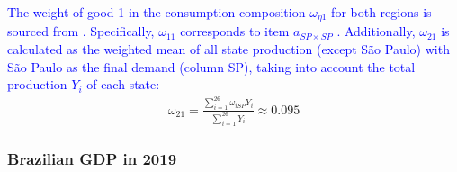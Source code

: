 \documentclass[../thesis.tex]{subfiles}
\begin{document}
\textcolor{blue}{The weight of good 1 in the consumption composition $\omega_{\eta 1}$ for both regions is sourced from \textcite[Table 3, p.442]{haddad_matriz_2017}. Specifically, $\omega_{11}$ corresponds to item $a_{SP\times SP}$ \label{eq:omega-e1}. Additionally, $\omega_{21}$ is calculated as the weighted mean of all state production (except São Paulo) with São Paulo as the final demand (column SP), taking into account the total production $Y_{i}$ of each state:}
\begin{align}
	\omega_{21} = \frac{\sum_{i=1}^{26} \omega_{iSP} Y_i}{\sum_{i=1}^{26} Y_i} \approx 0.095 \label{eq:omega-e2}
\end{align}

\newpage


\subsubsection{Brazilian GDP in 2019}

\vspace*{0.3cm}
\end{document}
